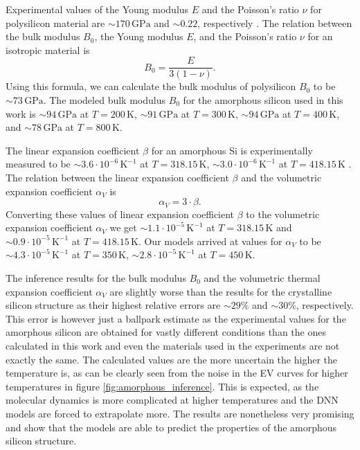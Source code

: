 Experimental values of the Young modulus $E$ and the Poisson's ratio $\nu$ for
polysilicon material are $\sim 170 \, \mathrm{GPa}$ and $\sim 0.22$, 
respectively \cite{Freund_Suresh_2003}. The relation between the bulk
modulus $B_0$, the Young modulus $E$, and the Poisson's ratio $\nu$ for an
isotropic material is
\begin{equation}
  B_0 = \frac{E}{3(1 - \nu)}.
\end{equation}
Using this formula, we can calculate the bulk modulus of polysilicon $B_0$ to
be $\sim 73 \, \mathrm{GPa}$. The modeled bulk modulus $B_0$ for the amorphous
silicon used in this work is
$\sim 94 \, \mathrm{GPa}$ at $T = 200 \, \mathrm{K}$,
$\sim 91 \, \mathrm{GPa}$ at $T = 300 \, \mathrm{K}$,
$\sim 94 \, \mathrm{GPa}$ at $T = 400 \, \mathrm{K}$,
and $\sim 78 \, \mathrm{GPa}$ at $T = 800 \, \mathrm{K}$.

The linear expansion coefficient $\beta$ for an amorphous Si is experimentally
measured to be $\sim 3.6 \cdot 10^{-6} \, \mathrm{K}^{-1}$ at
$T = 318.15 \, \mathrm{K}$, $\sim 3.0 \cdot 10^{-6} \, \mathrm{K}^{-1}$ at
$T = 418.15 \, \mathrm{K}$ \cite{TAKIMOTO2002314}. The relation between the
linear expansion coefficient $\beta$ and the volumetric expansion coefficient
$\alpha_V$ is
\begin{equation}
  \alpha_V = 3 \cdot \beta.
\end{equation}
Converting these values of linear expansion coefficient $\beta$ to the
volumetric expansion coefficient $\alpha_V$ we get
$\sim 1.1 \cdot 10^{-5} \, \mathrm{K}^{-1}$ at $T = 318.15 \, \mathrm{K}$ and
$\sim 0.9 \cdot 10^{-5} \, \mathrm{K}^{-1}$ at $T = 418.15 \, \mathrm{K}$.
Our models arrived at values for $\alpha_V$ to be
$\sim 4.3 \cdot 10^{-5} \, \mathrm{K}^{-1}$ at
$T = 350 \, \mathrm{K}$, $\sim 2.8 \cdot 10^{-5} \, \mathrm{K}^{-1}$ at
$T = 450 \, \mathrm{K}$.

The inference results for the bulk modulus $B_0$ and the volumetric thermal
expansion coefficient $\alpha_V$ are slightly worse than the results for the
crystalline silicon structure as their highest relative errors are
$\sim 29 \%$ and $\sim 30 \%$, respectively. This error is however just a
ballpark estimate as the experimental values for the amorphous silicon are
obtained for vastly different conditions than the ones calculated in this
work and even the materials used in the experiments are not exactly the same.
The calculated values are the more uncertain the higher the temperature is,
as can be clearly seen from the noise in the EV curves for higher temperatures
in figure \ref{fig:amorphous_inference}. This is expected, as the molecular
dynamics is more complicated at higher temperatures and the DNN models are
forced to extrapolate more. The results are nonetheless very promising and
show that the models are able to predict the properties of the amorphous
silicon structure.
